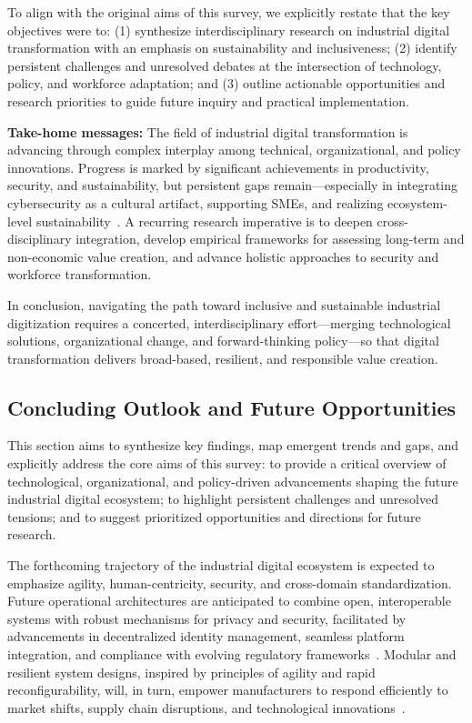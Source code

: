 \documentclass[sigconf]{acmart}
\begin{document}
To align with the original aims of this survey, we explicitly restate that the key objectives were to: (1) synthesize interdisciplinary research on industrial digital transformation with an emphasis on sustainability and inclusiveness; (2) identify persistent challenges and unresolved debates at the intersection of technology, policy, and workforce adaptation; and (3) outline actionable opportunities and research priorities to guide future inquiry and practical implementation.

\textbf{Take-home messages:} The field of industrial digital transformation is advancing through complex interplay among technical, organizational, and policy innovations. Progress is marked by significant achievements in productivity, security, and sustainability, but persistent gaps remain—especially in integrating cybersecurity as a cultural artifact, supporting SMEs, and realizing ecosystem-level sustainability~\cite{ref25}\cite{ref35}. A recurring research imperative is to deepen cross-disciplinary integration, develop empirical frameworks for assessing long-term and non-economic value creation, and advance holistic approaches to security and workforce transformation.

In conclusion, navigating the path toward inclusive and sustainable industrial digitization requires a concerted, interdisciplinary effort—merging technological solutions, organizational change, and forward-thinking policy—so that digital transformation delivers broad-based, resilient, and responsible value creation.

\subsection{Concluding Outlook and Future Opportunities}

This section aims to synthesize key findings, map emergent trends and gaps, and explicitly address the core aims of this survey: to provide a critical overview of technological, organizational, and policy-driven advancements shaping the future industrial digital ecosystem; to highlight persistent challenges and unresolved tensions; and to suggest prioritized opportunities and directions for future research.

The forthcoming trajectory of the industrial digital ecosystem is expected to emphasize agility, human-centricity, security, and cross-domain standardization. Future operational architectures are anticipated to combine open, interoperable systems with robust mechanisms for privacy and security, facilitated by advancements in decentralized identity management, seamless platform integration, and compliance with evolving regulatory frameworks~\cite{ref41}\cite{ref86}\cite{ref93}. Modular and resilient system designs, inspired by principles of agility and rapid reconfigurability, will, in turn, empower manufacturers to respond efficiently to market shifts, supply chain disruptions, and technological innovations~\cite{ref3}\cite{ref68}.
\end{document}
